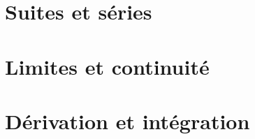 \documentclass[a4paper, 10pt, twoside]{report}
\begin{document}
\chapter{Suites et séries}

    

\chapter{Limites et continuité}

    

\chapter{Dérivation et intégration}

    


%     
    

%     
        

%     


%     


%     

\end{document}
